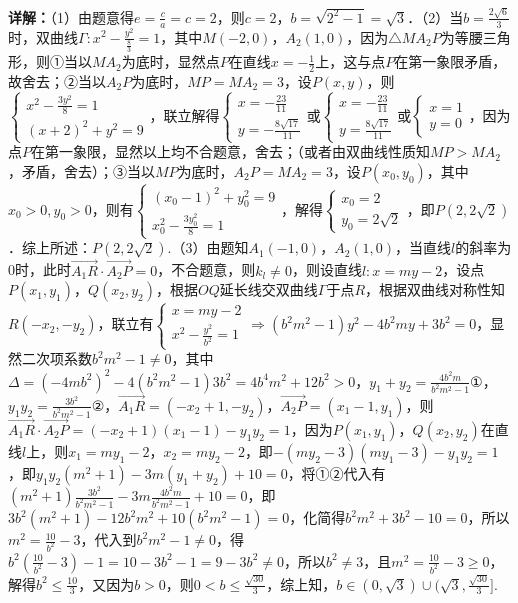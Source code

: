 \begin{question}[points=18]
\begin{solution}
\textbf{详解：}（1）由题意得$e=\frac{c}{a}=c=2$，则$c=2$，$b=\sqrt{2^2-1}=\sqrt3$．（2）当$b=\frac{2\sqrt6}{3}$时，双曲线$\Gamma:x^2-\frac{y^2}{\frac{8}{3}}=1$，其中$M(-2,0)$，$A_2(1,0)$，因为$\triangle MA_2P$为等腰三角形，则①当以$MA_2$为底时，显然点$P$在直线$x=-\frac12$上，这与点$P$在第一象限矛盾，故舍去；②当以$A_2P$为底时，$MP=MA_2=3$，设$P(x,y)$，则$\begin{cases} x^2-\frac{3y^2}{8}=1 \\ (x+2)^2+y^2=9 \end{cases}$，联立解得$\begin{cases} x=-\frac{23}{11} \\ y=-\frac{8\sqrt{17}}{11} \end{cases}$或$\begin{cases} x=-\frac{23}{11} \\ y=\frac{8\sqrt{17}}{11} \end{cases}$或$\begin{cases} x=1 \\ y=0 \end{cases}$，因为点$P$在第一象限，显然以上均不合题意，舍去；（或者由双曲线性质知$MP>MA_2$，矛盾，舍去）；③当以$MP$为底时，$A_2P=MA_2=3$，设$P(x_0,y_0)$，其中$x_0>0,y_0>0$，则有$\begin{cases} (x_0-1)^2+y_0^2=9 \\ x_0^2-\frac{3y_0^2}{8}=1 \end{cases}$，解得$\begin{cases} x_0=2 \\ y_0=2\sqrt2 \end{cases}$，即$P(2,2\sqrt2)$．综上所述：$P(2,2\sqrt2)$.（3）由题知$A_1(-1,0)$，$A_2(1,0)$，当直线$l$的斜率为0时，此时$\overrightarrow{A_1R}\cdot\overrightarrow{A_2P}=0$，不合题意，则$k_l\neq0$，则设直线$l:x=my-2$，设点$P(x_1,y_1)$，$Q(x_2,y_2)$，根据$OQ$延长线交双曲线$\Gamma$于点$R$，根据双曲线对称性知$R(-x_2,-y_2)$，联立有$\begin{cases} x=my-2 \\ x^2-\frac{y^2}{b^2}=1 \end{cases}\Rightarrow (b^2m^2-1)y^2-4b^2my+3b^2=0$，显然二次项系数$b^2m^2-1\neq0$，其中$\Delta=(-4mb^2)^2-4(b^2m^2-1)3b^2=4b^4m^2+12b^2>0$，$y_1+y_2=\frac{4b^2m}{b^2m^2-1}①$，$y_1y_2=\frac{3b^2}{b^2m^2-1}②$，$\overrightarrow{A_1R}=(-x_2+1,-y_2)$，$\overrightarrow{A_2P}=(x_1-1,y_1)$，则$\overrightarrow{A_1R}\cdot\overrightarrow{A_2P}=(-x_2+1)(x_1-1)-y_1y_2=1$，因为$P(x_1,y_1)$，$Q(x_2,y_2)$在直线$l$上，则$x_1=my_1-2$，$x_2=my_2-2$，即$-(my_2-3)(my_1-3)-y_1y_2=1$，即$y_1y_2(m^2+1)-3m(y_1+y_2)+10=0$，将①②代入有$(m^2+1)\frac{3b^2}{b^2m^2-1}-3m\frac{4b^2m}{b^2m^2-1}+10=0$，即$3b^2(m^2+1)-12b^2m^2+10(b^2m^2-1)=0$，化简得$b^2m^2+3b^2-10=0$，所以$m^2=\frac{10}{b^2}-3$，代入到$b^2m^2-1\neq0$，得$b^2(\frac{10}{b^2}-3)-1=10-3b^2-1=9-3b^2\neq0$，所以$b^2\neq3$，且$m^2=\frac{10}{b^2}-3\ge0$，解得$b^2\le\frac{10}{3}$，又因为$b>0$，则$0<b\le\frac{\sqrt{30}}{3}$，综上知，$b\in(0,\sqrt3)\cup(\sqrt3,\frac{\sqrt{30}}{3}]$.
\end{solution}
\end{question}

